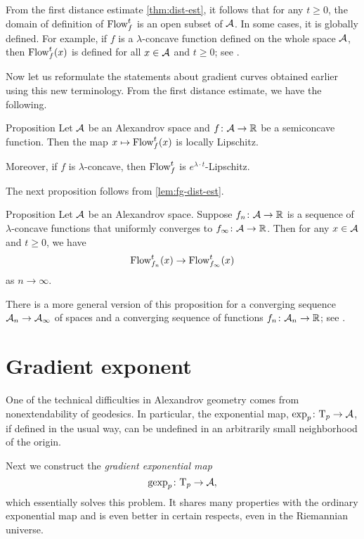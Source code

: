 From the first distance estimate \ref{thm:dist-est}, 
it follows that for any $t\ge 0$, the domain of definition of $\mathop{\rm Flow}\nolimits^t_f$ is an open subset of $\mathcal{A}$.
In some cases, it is globally defined.
For example, if $f$ is a $\lambda$-concave function defined on the whole space $\mathcal{A}$, then $\mathop{\rm Flow}\nolimits^t_f(x)$ is defined for all $x\in \mathcal{A}$ and $t\ge0$;
see \cite[16.19]{alexander-kapovitch-petrunin2024}.

Now let us reformulate the statements about gradient curves obtained earlier using this new terminology.
From the first distance estimate, we have the following.

\begin{thm}{Proposition}\label{prop:GF-is-lip}
Let $\mathcal{A}$ be an Alexandrov space 
and $f\colon\mathcal{A}\to \mathbb{R}$ be a semiconcave function.
Then the map $x\mapsto\mathop{\rm Flow}\nolimits^t_f(x)$ is locally Lipschitz.

Moreover, if $f$ is $\lambda$-concave, then $\mathop{\rm Flow}\nolimits^t_f$ is $e^{\lambda\cdot t}$-Lipschitz.
\end{thm}

The next proposition follows from \ref{lem:fg-dist-est}.

\begin{thm}{Proposition}\label{grad-curve-conv}
Let $\mathcal{A}$ be an Alexandrov space.
Suppose $f_n\colon\mathcal{A}\to\mathbb{R}$ is a sequence of
$\lambda$-concave functions 
that uniformly converges to $f_\infty\colon\mathcal{A}\to \mathbb{R}$. 
Then for any $x\in \mathcal{A}$ and $t\ge 0$, we have
\[\mathop{\rm Flow}\nolimits_{f_n}^t(x)\to \mathop{\rm Flow}\nolimits_{f_\infty}^t(x)\]
as $n\to \infty$.
\end{thm}

There is a more general version of this proposition for a converging sequence $\mathcal{A}_n\to \mathcal{A}_\infty$ of spaces and a converging sequence of functions $f_n\colon\mathcal{A}_n\to\mathbb{R}$; see \cite[16.21]{alexander-kapovitch-petrunin2024}.

\section{Gradient exponent}\label{gexp}

One of the technical difficulties in Alexandrov geometry comes from
nonextendability of geodesics. 
In particular, the exponential map, $\exp_p\colon\mathrm{T}_p\to \mathcal{A}$, if defined in the usual way, can
be undefined in an arbitrarily small neighborhood of the origin. 

Next we construct the \emph{gradient exponential map} 
\[\operatorname{\rm gexp}\nolimits_p\colon\mathrm{T}_p\to\mathcal{A},\]
which essentially solves this problem. 
It shares many properties with the ordinary exponential map and is even better in certain respects,
even in the Riemannian universe.

